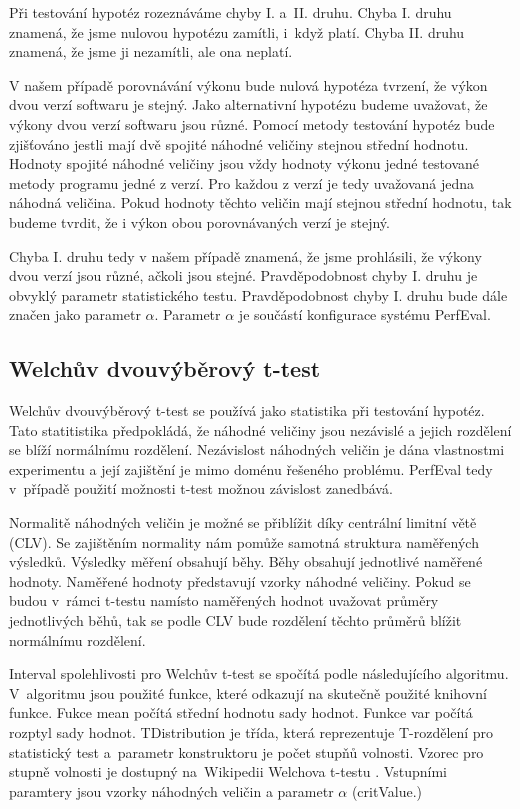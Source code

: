 Při testování hypotéz rozeznáváme
chyby I. a~II. druhu. Chyba I. druhu znamená, že jsme nulovou hypotézu zamítli,
i~když platí. Chyba II. druhu znamená, že jsme ji nezamítli, ale ona neplatí.

V našem případě porovnávání výkonu bude nulová hypotéza tvrzení, že výkon dvou verzí softwaru je stejný.
Jako alternativní hypotézu budeme uvažovat, že výkony dvou verzí softwaru jsou různé.
Pomocí metody testování hypotéz bude zjišťováno jestli mají dvě spojité náhodné veličiny stejnou střední hodnotu.
Hodnoty spojité náhodné veličiny jsou vždy hodnoty výkonu jedné testované metody programu jedné z verzí.
Pro každou z verzí je tedy uvažovaná jedna náhodná veličina.
Pokud hodnoty těchto veličin mají stejnou střední hodnotu, tak budeme tvrdit, že i výkon obou porovnávaných
verzí je stejný.

Chyba I. druhu tedy v našem případě znamená, že jsme prohlásili, že výkony dvou verzí jsou různé,
ačkoli jsou stejné. Pravděpodobnost chyby I. druhu je obvyklý parametr statistického testu.
Pravděpodobnost chyby I. druhu bude dále značen jako parametr $\alpha$. Parametr $\alpha$
je součástí konfigurace systému PerfEval.

\subsection{Welchův dvouvýběrový t-test}

Welchův dvouvýběrový t-test se používá jako statistika při testování hypotéz.
Tato statitistika předpokládá, že náhodné veličiny jsou nezávislé a jejich rozdělení
se blíží normálnímu rozdělení. Nezávislost náhodných veličin je dána vlastnostmi
experimentu \cite[]{twosampletests} a její zajištění je mimo doménu řešeného problému. PerfEval
tedy v~případě použití možnosti t-test možnou závislost zanedbává.

Normalitě náhodných veličin je možné se přiblížit díky centrální limitní větě (CLV).
Se zajištěním normality nám pomůže samotná struktura naměřených výsledků. Výsledky měření
obsahují běhy. Běhy obsahují jednotlivé naměřené hodnoty. Naměřené hodnoty představují
vzorky náhodné veličiny. Pokud se budou v~rámci t-testu namísto naměřených hodnot uvažovat
průměry jednotlivých běhů, tak se podle CLV bude rozdělení těchto průměrů blížit normálnímu rozdělení.


Interval spolehlivosti pro Welchův t-test se spočítá podle následujícího algoritmu. V~algoritmu jsou
použité funkce, které odkazují na skutečně použité knihovní funkce. Fukce mean počítá střední hodnotu
sady hodnot. Funkce var počítá rozptyl sady hodnot. TDistribution je třída, která reprezentuje T-rozdělení
pro statistický test a~parametr konstruktoru je počet stupňů volnosti. Vzorec pro stupně volnosti je dostupný na~Wikipedii
Welchova t-testu \cite[]{enwiki:1184251732}. Vstupními paramtery jsou vzorky náhodných veličin a parametr $\alpha$ (critValue.)

